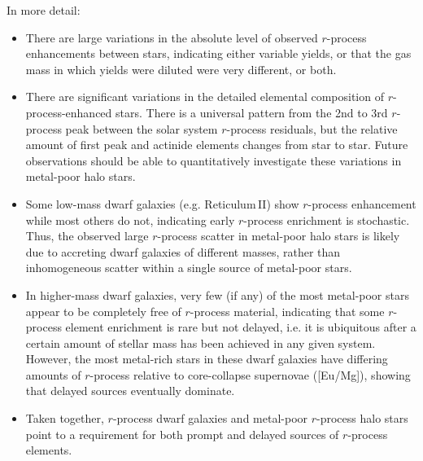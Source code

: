 \documentclass[letterpaper]{article}
\begin{document}
In more detail:
\begin{itemize}



\item There are large variations in the absolute level of observed $r$-process enhancements between stars, indicating either variable yields, or that the gas mass in which yields were diluted were very different, or both. 

\item There are significant variations in the detailed elemental composition of $r$-process-enhanced stars. There is a universal pattern from the 2nd to 3rd $r$-process peak between the solar system $r$-process residuals, but the relative amount of first peak and actinide elements changes from star to star. Future observations should be able to quantitatively investigate these variations in metal-poor halo stars.

\item Some low-mass dwarf galaxies (e.g. Reticulum\,II) show $r$-process enhancement while most others do not, indicating early $r$-process enrichment is stochastic. Thus, the observed large $r$-process scatter in metal-poor halo stars is likely due to accreting dwarf galaxies of different masses, rather than inhomogeneous scatter within a single source of metal-poor stars. 

\item In higher-mass dwarf galaxies, very few (if any) of the most metal-poor stars appear to be completely free of $r$-process material, indicating that some $r$-process element enrichment is rare but not delayed, i.e. it is ubiquitous after a certain amount of stellar mass has been achieved in any given system.
However, the most metal-rich stars in these dwarf galaxies have differing amounts of $r$-process relative to core-collapse supernovae ([Eu/Mg]), showing that delayed sources eventually dominate.

\item Taken together, $r$-process dwarf galaxies and metal-poor $r$-process halo stars point to a requirement for both prompt and delayed sources of $r$-process elements.



\end{itemize}







\end{document}
